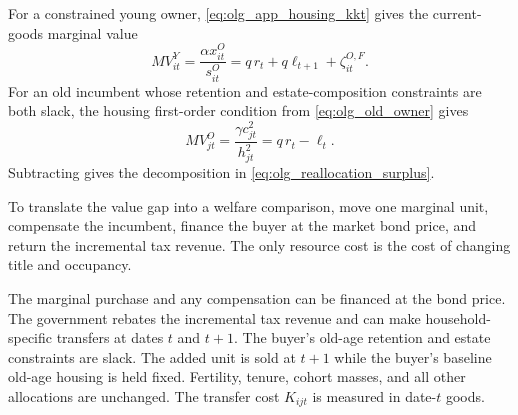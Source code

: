 For a constrained young owner, \eqref{eq:olg_app_housing_kkt} gives the
current-goods marginal value
\begin{equation}
 MV_{it}^Y=\frac{\alpha x_{it}^O}{s_{it}^O}
 =q\,r_t+q\ell_{t+1}+\zeta_{it}^{O,F}.
 \label{eq:olg_app_young_mv}
\end{equation}
For an old incumbent whose retention and estate-composition constraints are
both slack, the housing first-order condition from \eqref{eq:olg_old_owner}
gives
\begin{equation}
 MV_{jt}^O=\frac{\gamma c_{jt}^2}{h_{jt}^2}=q\,r_t-\ell_t.
 \label{eq:olg_app_old_mv}
\end{equation}
Subtracting gives the decomposition in
\eqref{eq:olg_reallocation_surplus}.

To translate the value gap into a welfare comparison, move one marginal unit,
compensate the incumbent, finance the buyer at the market bond price, and
return the incremental tax revenue.  The only resource cost is the cost of
changing title and occupancy.

\begin{assumption}[Implementation]
\label{ass:olg_two_date_ledger}
The marginal purchase and any compensation can be financed at the bond price.
The government rebates the incremental tax revenue and can make
household-specific transfers at dates $t$ and $t+1$.  The buyer's old-age
retention and estate constraints are slack.  The added unit is sold at $t+1$
while the buyer's baseline old-age housing is held fixed.  Fertility, tenure,
cohort masses, and all other allocations are unchanged.  The transfer cost
$K_{ijt}$ is measured in date-$t$ goods.
\end{assumption}

